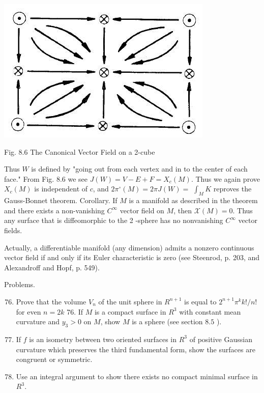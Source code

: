 \documentclass[10pt]{article}
\begin{document}
\includegraphics[max width=\textwidth]{2022_07_16_f4e476ee2159dc67e746g-60(2)}

Fig. $8.6$ The Canonical Vector Field on a 2-cube

Thus $W$ is defined by "going out from each vertex and in to the center of each face." From Fig. $8.6$ we see $J(W)=V-E+F=X_{c}(M)$. Thus we again prove $X_{c}(M)$ is independent of $c$, and $2 \pi^{\circ}(M)=2 \pi J(W)=$ $\int_{M} K$ reproves the Gauss-Bonnet theorem. Corollary. If $M$ is a manifold as described in the theorem and there exists a non-vanishing $C^{\infty}$ vector field on $M$, then $\mathscr{X}(M)=0$. Thus any surface that is diffeomorphic to the 2 -sphere has no nonvanishing $C^{\infty}$ vector fields.

Actually, a differentiable manifold (any dimension) admits a nonzero continuous vector field if and only if its Euler characteristic is zero (see Steenrod, p. 203, and Alexandroff and Hopf, p. 549).




Problems.

\begin{enumerate}
  \setcounter{enumi}{75}
  \item Prove that the volume $V_{n}$ of the unit sphere in $R^{n+1}$ is equal to $2^{n+1} \pi^{k} k ! / n !$ for even $n=2 k$ 76. If $M$ is a compact surface in $R^{3}$ with constant mean curvature and $y_{3}>0$ on $M$, show $M$ is a sphere (see section $8.5$ ).

  \item If $f$ is an isometry between two oriented surfaces in $R^{3}$ of positive Gaussian curvature which preserves the third fundamental form, show the surfaces are congruent or symmetric.

  \item Use an integral argument to show there exists no compact minimal surface in $R^{3}$.

\end{enumerate}
\end{document}
